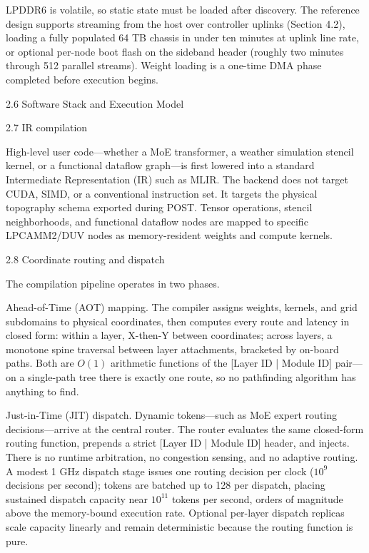 \documentclass[10pt,twocolumn]{article}
\begin{document}
LPDDR6 is volatile, so static state must be loaded after discovery. The reference design supports streaming from the host over controller uplinks (Section 4.2), loading a fully populated 64 TB chassis in under ten minutes at uplink line rate, or optional per-node boot flash on the sideband header (roughly two minutes through 512 parallel streams). Weight loading is a one-time DMA phase completed before execution begins.

2.6 Software Stack and Execution Model

2.7 IR compilation

High-level user code---whether a MoE transformer, a weather simulation stencil kernel, or a functional dataflow graph---is first lowered into a standard Intermediate Representation (IR) such as MLIR\cite{18}. The backend does not target CUDA, SIMD, or a conventional instruction set. It targets the physical topography schema exported during POST. Tensor operations, stencil neighborhoods, and functional dataflow nodes are mapped to specific LPCAMM2/DUV nodes as memory-resident weights and compute kernels.

2.8 Coordinate routing and dispatch

The compilation pipeline operates in two phases.

Ahead-of-Time (AOT) mapping. The compiler assigns weights, kernels, and grid subdomains to physical coordinates, then computes every route and latency in closed form: within a layer, X-then-Y between coordinates; across layers, a monotone spine traversal between layer attachments, bracketed by on-board paths. Both are $O(1)$ arithmetic functions of the [Layer ID | Module ID] pair---on a single-path tree there is exactly one route, so no pathfinding algorithm has anything to find.

Just-in-Time (JIT) dispatch. Dynamic tokens---such as MoE expert routing decisions---arrive at the central router. The router evaluates the same closed-form routing function, prepends a strict [Layer ID | Module ID] header, and injects. There is no runtime arbitration, no congestion sensing, and no adaptive routing. A modest 1 GHz dispatch stage issues one routing decision per clock ($10^9$ decisions per second); tokens are batched up to 128 per dispatch, placing sustained dispatch capacity near $10^{11}$ tokens per second, orders of magnitude above the memory-bound execution rate. Optional per-layer dispatch replicas scale capacity linearly and remain deterministic because the routing function is pure.
\end{document}
